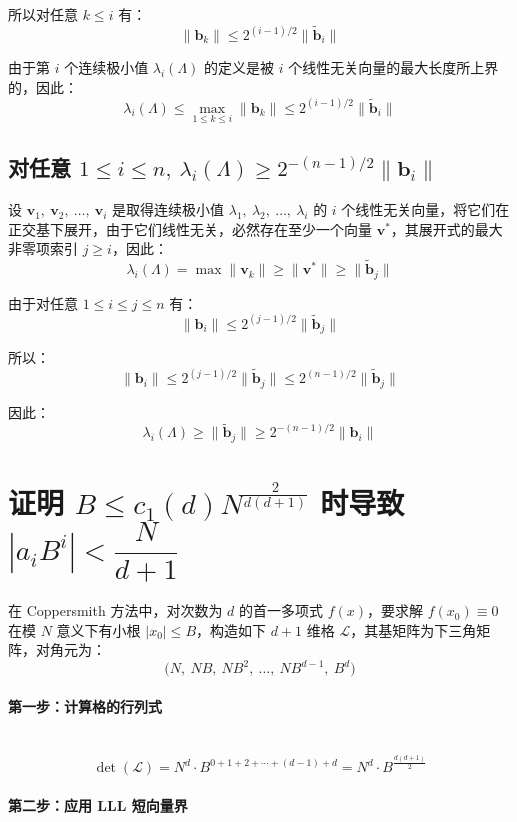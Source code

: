 \documentclass{article}
\begin{document}
所以对任意 $k\leqslant i$ 有：
\[ \|\bm{b}_k\|\leqslant2^{(i-1)/2}\|\tilde{\bm{b}}_i\| \]

由于第 $i$ 个连续极小值 $\lambda_i(\Lambda)$ 的定义是被 $i$ 个线性无关向量的最大长度所上界的，因此：
\[ \lambda_i(\Lambda)\leqslant\max\limits_{1\leqslant k\leqslant i}\|\bm{b}_k\|\leqslant2^{(i-1)/2}\|\tilde{\bm{b}}_i\| \]



\subsection{对任意 $1\leqslant i\leqslant n,\ \lambda_i(\Lambda)\geqslant2^{-(n-1)/2}\|\bm{b}_i\|$}
设 $\bm{v}_1,\ \bm{v}_2,\ \ldots,\ \bm{v}_i$ 是取得连续极小值 $\lambda_1,\ \lambda_2,\ \ldots,\ \lambda_i$ 的 $i$ 个线性无关向量，将它们在正交基下展开，由于它们线性无关，必然存在至少一个向量 $\bm{v}^{*}$，其展开式的最大非零项索引 $j\geqslant i$，因此：
\[ \lambda_i(\Lambda)=\max\|\bm{v}_k\|\geqslant\|\bm{v}^{*}\|\geqslant\|\tilde{\bm{b}}_j\| \]

由于对任意 $1\leqslant i\leqslant j\leqslant n$ 有：
\[ \|\bm{b}_i\|\leqslant2^{(j-1)/2}\|\tilde{\bm{b}}_j\| \]

所以：
\[ \|\bm{b}_i\|\leqslant2^{(j-1)/2}\|\tilde{\bm{b}}_j\|\leqslant2^{(n-1)/2}\|\tilde{\bm{b}}_j\| \]

因此：
\[ \lambda_i(\Lambda)\geqslant\|\tilde{\bm{b}}_j\|\geqslant2^{-(n-1)/2}\|\bm{b}_i\| \]



\section{证明 $B\leqslant c_1(d)N^{\tfrac{2}{d(d+1)}}$ 时导致 $\left|a_iB^i\right|<\dfrac{N}{d+1}$}
在 Coppersmith 方法中，对次数为 $d$ 的首一多项式 $f(x)$，要求解 $f(x_0)\equiv0$ 在模 $N$ 意义下有小根 $|x_0|\leqslant B$，构造如下 $d+1$ 维格 $\mathcal{L}$，其基矩阵为下三角矩阵，对角元为：
\[ \bigl(N,\ NB,\ NB^2,\ \ldots,\ NB^{d-1},\ B^d\bigr) \]

\paragraph*{第一步：计算格的行列式}~{}
\[ \det(\mathcal{L}) = N^d \cdot B^{0+1+2+\cdots+(d-1)+d} = N^d \cdot B^{\tfrac{d(d+1)}{2}} \]



\paragraph*{第二步：应用 LLL 短向量界}~{}
\end{document}
